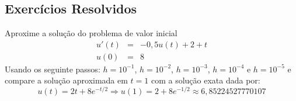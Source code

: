 \subsection*{Exercícios Resolvidos}
\begin{exeresol}\label{pvi:exeresol1} Aproxime a solução do problema de valor inicial
\begin{eqnarray}
     u'(t)&=& -0,5u(t)+2+t\\
            u(0) &=&  8
\end{eqnarray}
Usando os seguinte passos: $h=10^{-1}$, $h=10^{-2}$, $h=10^{-3}$, $h=10^{-4}$ e $h=10^{-5}$ e compare a solução aproximada em $t=1$ com a solução exata dada por:
\begin{equation}
     u(t) = 2t+8e^{-t/2} \Longrightarrow u(1)=2+8e^{-1/2} \approx 6,85224527770107
\end{equation}
\end{exeresol}

